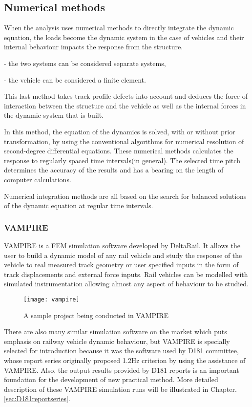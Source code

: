 \subsection{Numerical methods}

When the analysis uses numerical methods to directly integrate the dynamic equation, the loads become the dynamic system in the case of vehicles and their internal behaviour impacts the response from the structure.

- the two systems can be considered separate systems,

- the vehicle can be considered a finite element.

This last method takes track profile defects into account and deduces the force of interaction between the structure and the vehicle as well as the internal forces in the dynamic system that is built.

In this method, the equation of the dynamics is solved, with or without prior transformation, by using the conventional algorithms for numerical resolution of second-degree differential equations. These numerical methods calculates the response to regularly spaced time intervals(in general). The selected time pitch determines the accuracy of the results and has a bearing on the length of computer calculations.

Numerical integration methods are all based on the search for balanced solutions of the dynamic equation at regular time intervals.

\subsubsection{VAMPIRE}

VAMPIRE is a FEM simulation software developed by DeltaRail. It allows the user to build a dynamic model of any rail vehicle and study the response of the vehicle to real measured track geometry or user specified inputs in the form of track displacements and external force inputs. Rail vehicles can be modelled with simulated instrumentation allowing almost any aspect of behaviour to be studied. 

\begin{figure}[h!]
    \centering
    \texttt{[image: vampire]}
    \caption{A sample project being conducted in VAMPIRE}
    \label{fig:vampire}
\end{figure}

There are also many similar simulation software on the market which puts emphasis on railway vehicle dynamic behaviour, but VAMPIRE is specially selected for introduction because it was the software used by D181 committee, whose report series originally proposed 1.2Hz criterion by using the assistance of VAMPIRE. Also, the output results provided by D181 reports is an important foundation for the development of new practical method. More detailed description of these VAMPIRE simulation runs will be illustrated in Chapter.\ref{sec:D181reportseries}.

